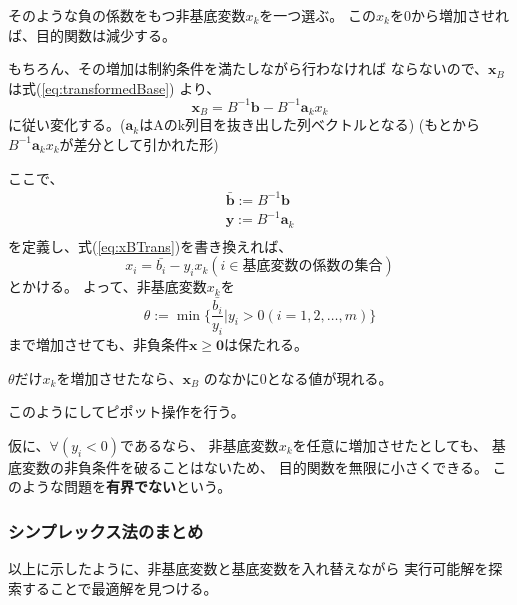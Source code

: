\documentclass[9pt]{ltjsreport}
\begin{document}
    そのような負の係数をもつ非基底変数$x_k$を一つ選ぶ。
    この$x_k$を0から増加させれば、目的関数は減少する。

    もちろん、その増加は制約条件を満たしながら行わなければ
    ならないので、$\bm{x}_B$は式(\ref{eq:transformedBase})
    より、
    \begin{equation}
        \bm{x}_B=B^{-1}\bm{b}-B^{-1}\bm{a}_kx_k \label{eq:xBTrans}
    \end{equation}
    に従い変化する。($\bm{a}_k$はAのk列目を抜き出した列ベクトルとなる)
    (もとから$B^{-1}\bm{a}_kx_k$が差分として引かれた形)

    ここで、
    \begin{gather}
        \bar{\bm{b}}:=B^{-1}\bm{b}\\
        \bm{y}:=B^{-1}\bm{a}_k\\
    \end{gather}
    を定義し、式(\ref{eq:xBTrans})を書き換えれば、
    \begin{equation}
        x_i=\bar{b_i}-y_ix_k (i\in 基底変数の係数の集合)
    \end{equation}
    とかける。
    よって、非基底変数$x_k$を
    \begin{equation}
       \theta :=\min\{\frac{\bar{b_i}}{y_i}|y_i>0(i=1,2,\dots,m)\}
    \end{equation}
    まで増加させても、非負条件$\bm{x}\ge\bm{0}$は保たれる。

    $\theta$だけ$x_k$を増加させたなら、$\bm{x}_B$
    のなかに0となる値が現れる。

    このようにしてピポット操作を行う。

\begin{tcolorbox}[title=有界でない問題]
        仮に、$\forall (y_i<0)$であるなら、
    非基底変数$x_k$を任意に増加させたとしても、
    基底変数の非負条件を破ることはないため、
    目的関数を無限に小さくできる。
    このような問題を\textbf{有界でない}という。
\end{tcolorbox}

\subsubsection{シンプレックス法のまとめ}
以上に示したように、非基底変数と基底変数を入れ替えながら
実行可能解を探索することで最適解を見つける。
\end{document}

